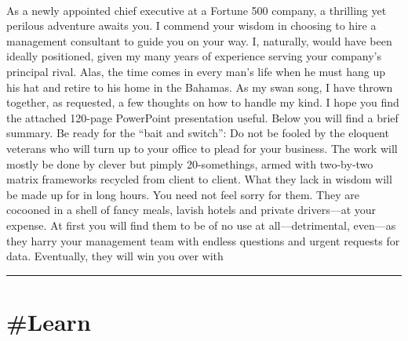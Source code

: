 \documentclass[10pt,a4paper]{article}
\begin{document}
\begin{multicols*}{2}
\paragraph{}
 As a newly appointed chief executive at a Fortune 500 company, a thrilling yet perilous adventure awaits you. I commend your wisdom in choosing to hire a management consultant to guide you on your way.
I, naturally, would have been ideally positioned, given my many years of experience serving your company’s principal rival. Alas, the time comes in every man’s life when he must hang up his hat and retire to his home in the Bahamas. As my swan song, I have thrown together, as requested, a few thoughts on how to handle my kind. I hope you find the attached 120-page PowerPoint presentation useful. Below you will find a brief summary.
Be ready for the “bait and switch”: Do not be fooled by the eloquent veterans who will turn up to your office to plead for your business. The work will mostly be done by clever but pimply 20-somethings, armed with two-by-two matrix frameworks recycled from client to client. What they lack in wisdom will be made up for in long hours. You need not feel sorry for them. They are cocooned in a shell of fancy meals, lavish hotels and private drivers—at your expense.
At first you will find them to be of no use at all—detrimental, even—as they harry your management team with endless questions and urgent requests for data. Eventually, they will win you over with
\par\noindent\textcolor{red}{\rule{\linewidth}{0.2mm}}
\vfill
\null
\end{multicols*}

\newpage
\section{\#Learn}
\end{document}
